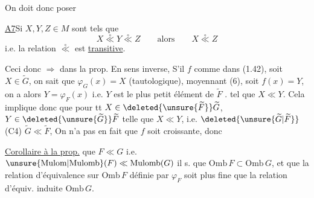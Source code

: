 On doit donc poser

\uline{A7}\quad Si $X,Y,Z\in M$ sont tels que
\[
 X\overset{\circ}{\ll}Y\overset{\circ}{\ll}Z\qquad\text{alors}\qquad X\overset{\circ}{\ll}Z
\]
i.e. la relation $\overset{\circ}{\ll}$ est \uline{transitive}.

Ceci  donc $\Rightarrow$ dans la prop.
En sens inverse, S'il  $f$ comme dans (1.42), soit $X\in\widetilde G$,   on sait que $\varphi_G(x)=X$ (tautologique), moyennant (6),  soit $f(x)=Y$, on a alors $Y=\varphi_F(x)$ i.e. $Y$ est le plus petit élément de $\widetilde F$ .  tel que $X\ll Y$. Cela  implique donc que pour tt $X\in\deleted{\unsure{\widetilde F}}\widetilde G$,  $Y\in\deleted{\unsure{\widetilde G}}\widetilde F$ telle que $X\ll Y$, i.e. $\deleted{\unsure{\widetilde G|\widetilde F}}$ (C4) $\widetilde G\ll\widetilde F$,  On n'a pas  en fait que $f$ soit croissante, donc

\uline{Corollaire à la prop.}\quad {}  que $F\ll G$ i.e. $\unsure{\mathrm{Mulom}|\mathrm{Mulomb}}(F)\ll\mathrm{Mulomb}(G)$ il s. que $\mathrm{Omb}\,F\subset\mathrm{Omb}\,G$,
et que  la relation d'équivalence  sur $\mathrm{Omb}\,F$ définie par $\varphi_F$ soit plus fine que la relation d'équiv. induite  $\mathrm{Omb}\,G$.

